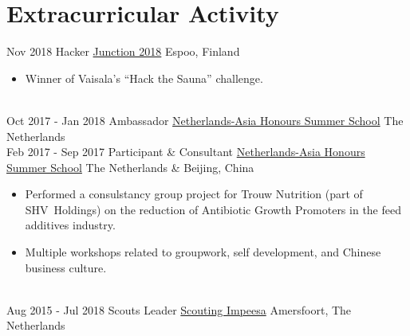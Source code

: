 \documentclass[letterpaper]{twentysecondcv} %
\begin{document}

\section{Extracurricular Activity}
\begin{twenty} %
	\twentyitem
	{Nov 2018}
	{}
	{Hacker}
	{\href{https://2018.hackjunction.com/}{Junction 2018}}
	{Espoo, Finland}
	{
	\begin{itemize}
			\item Winner of Vaisala's ``Hack the Sauna'' challenge.
	\end{itemize}
	}
	\\
	\twentyitem
	{Oct 2017 -}
	{Jan 2018}
	{Ambassador}
	{\href{https://nahss.nl}{Netherlands-Asia Honours Summer School}}
	{The Netherlands}
	{}
	\\
	\twentyitem
	{Feb 2017 -}
	{Sep 2017}
	{Participant \& Consultant}
	{\href{https://nahss.nl}{Netherlands-Asia Honours Summer School}}
	{The Netherlands \& Beijing, China}
	{
		\begin{itemize}
			\item Performed a consulstancy group project for Trouw Nutrition (part of SHV~Holdings) on the reduction of Antibiotic Growth Promoters in the feed additives industry.
			\item Multiple workshops related to groupwork, self development, and Chinese business culture.
		\end{itemize}
	}
	\\
	\twentyitem
	{Aug 2015 -}
	{Jul 2018}
	{Scouts Leader}
	{\href{http://impeesa.nl/}{Scouting Impeesa}}
	{Amersfoort, The Netherlands}
	{}
	\\
\end{twenty}
\end{document}
